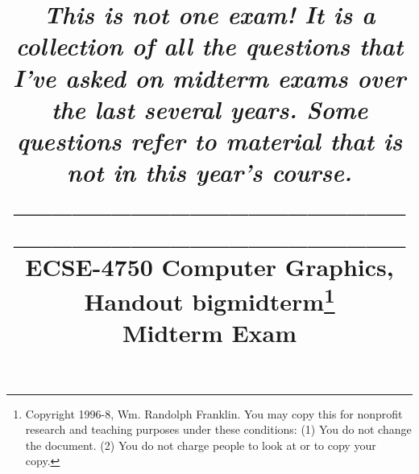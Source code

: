 \documentclass[twoside]{article}
\newcommand{\handout}{bigmidterm}
\begin{document}
\PScommands


\title{
\emph{This is not one exam!  It is a collection of all the
questions that I've asked on midterm exams over the last several
years.  Some questions refer to material that is not in this
year's course.}\\
\_\_\_\_\_\_\_\_\_\_\_\_\_\_\_\_\_\_\_\_\_\_\_\_\_\_\_\_\_\_\_\_\_\_\_\_\_\_\_\_ \\[.2in]
ECSE-4750 Computer Graphics,  \thissemester \\
Handout \handout\footnote{Copyright 1996-8, Wm. Randolph Franklin.
You may copy this for nonprofit research and teaching purposes
under these conditions:  (1) You do not change the document.  (2) You do not
charge people to look at or to copy your copy.}
\\
Midterm Exam}
\author{}



\maketitle






\newcommand{\asp}[1]{}

\end{document}
